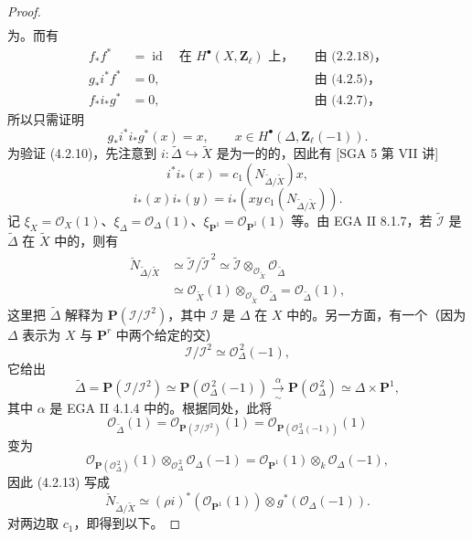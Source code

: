 \begin{proof}
\[\begin{aligned}
\end{aligned}\tag{4.2.9}
\]
为。而有
\[
\begin{aligned}
f_*f^*&=\operatorname{id}\quad\text{在 }H^\bullet(X,\mathbf Z_\ell)\text{ 上，}& &\text{由 (2.2.18)，}\\
g_*i^*f^*&=0,&&\text{由 (4.2.5)，}\\
f_*i_*g^*&=0,&&\text{由 (4.2.7)，}
\end{aligned}
\]
所以只需证明
\[
 g_*i^*i_*g^*(x)=x,\qquad x\in H^\bullet(\Delta,\mathbf Z_\ell(-1)).\tag{4.2.10}
\]
为验证 (4.2.10)，先注意到 $i:\widetilde\Delta\hookrightarrow\widetilde X$ 是为一的的，因此有 [SGA 5 第 VII 讲]
\[
 i^*i_*(x)=c_1(N_{\widetilde\Delta/\widetilde X})x,\tag{4.2.11}
\]
\[
 i_*(x)i_*(y)=i_*(xy\,c_1(N_{\widetilde\Delta/\widetilde X})).\tag{4.2.12}
\]
记 $\xi_X=\mathscr O_X(1)$、$\xi_\Delta=\mathscr O_\Delta(1)$、$\xi_{\mathbf P^1}=\mathscr O_{\mathbf P^1}(1)$ 等。由 EGA II 8.1.7，若 $\widetilde{\mathscr I}$ 是 $\widetilde\Delta$ 在 $\widetilde X$ 中的，则有
\[
\begin{aligned}
\check N_{\widetilde\Delta/\widetilde X}
&\simeq\widetilde{\mathscr I}/\widetilde{\mathscr I}^{\,2}
\simeq\widetilde{\mathscr I}\otimes_{\mathscr O_{\widetilde X}}\mathscr O_{\widetilde\Delta}\\
&\simeq\mathscr O_{\widetilde X}(1)\otimes_{\mathscr O_{\widetilde X}}\mathscr O_{\widetilde\Delta}
=\mathscr O_{\widetilde\Delta}(1),
\end{aligned}\tag{4.2.13}
\]
这里把 $\widetilde\Delta$ 解释为 $\mathbf P(\mathscr I/\mathscr I^2)$，其中 $\mathscr I$ 是 $\Delta$ 在 $X$ 中的。另一方面，有一个（因为 $\Delta$ 表示为 $X$ 与 $\mathbf P^r$ 中两个给定的交）
\[
 \mathscr I/\mathscr I^2\simeq\mathscr O_\Delta^{\,2}(-1),
\]
它给出
\[
 \widetilde\Delta=\mathbf P(\mathscr I/\mathscr I^2)\simeq\mathbf P(\mathscr O_\Delta^{\,2}(-1))\xrightarrow[\sim]{\alpha}\mathbf P(\mathscr O_\Delta^{\,2})\simeq\Delta\times\mathbf P^1,
\]
其中 $\alpha$ 是 EGA II 4.1.4 中的。根据同处，此将
\[
 \mathscr O_{\widetilde\Delta}(1)=\mathscr O_{\mathbf P(\mathscr I/\mathscr I^2)}(1)=\mathscr O_{\mathbf P(\mathscr O_\Delta^{\,2}(-1))}(1)
\]
变为
\[
 \mathscr O_{\mathbf P(\mathscr O_\Delta^{\,2})}(1)\otimes_{\mathscr O_\Delta^{\,2}}\mathscr O_\Delta(-1)
 =\mathscr O_{\mathbf P^1}(1)\otimes_k\mathscr O_\Delta(-1),
\]
因此 (4.2.13) 写成
\[
 \check N_{\widetilde\Delta/\widetilde X}\simeq(\rho i)^*(\mathscr O_{\mathbf P^1}(1))\otimes g^*(\mathscr O_\Delta(-1)).\tag{4.2.14}
\]
对两边取 $c_1$，即得到以下。
\end{proof}

